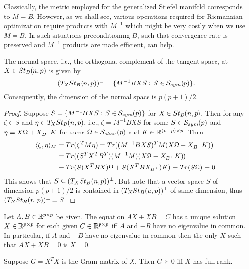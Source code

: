\documentclass[11pt,a4paper]{article}
\begin{document}
\begin{remark}
Classically, the metric employed for the generalized Stiefel manifold corresponds to $M = B$. However, as we shall see, various operations required for Riemannian optimization require products with $M^{-1}$ which might be very costly when we use $M = B$. In such situations preconditioning $B$, such that convergence rate is preserved and $M^{-1}$ products are made efficient, can help.
\end{remark}

\begin{proposition}
The normal space, i.e., the orthogonal complement of the tangent space, at $X\in St_B(n,p)$ is given by
\begin{equation}
(T_XSt_B(n,p))^\perp = \{M^{-1}BXS:\, S\in\mathcal{S}_{sym}(p) \}.
\end{equation}
Consequently, the dimension of the normal space is $p(p+1)/2$.
\end{proposition}

\begin{proof}
Suppose $S = \{M^{-1}BXS:\, S\in\mathcal{S}_{sym}(p) \}$ for $X\in St_B(n,p)$. Then for any $\zeta\in S$ and $\eta\in T_XSt_B(n,p)$, i.e., $\zeta = M^{-1}BXS$ for some $S\in \mathcal{S}_{sym}(p)$ and $\eta = X\Omega+X_{B^\perp} K$ for some $\Omega\in \mathcal{S}_{skew}(p)$ and $K\in \mathbb{R}^{(n-p)\times p}$. Then
\begin{align*}
\langle \zeta, \eta \rangle_M &= Tr(\zeta^TM\eta) = Tr((M^{-1}BXS)^TM(X\Omega+X_{B^\perp} K)) \\
&= Tr((S^TX^TB^T)(M^{-1}M)(X\Omega+X_{B^\perp} K)) \\
&= Tr(S(X^TBX)\Omega+S(X^TBX_{B^\perp}) K) = Tr(S\Omega) = 0.
\end{align*}
This shows that $S\subseteq (T_XSt_B(n,p))^\perp$. But note that a vector space $S$ of dimension $p(p+1)/2$ is contained in $(T_XSt_B(n,p))^\perp$ of same dimension, thus $(T_XSt_B(n,p))^\perp = S$.
\end{proof}

\begin{lemma}\label{lemma:sylvester_equation}
Let $A,B\in\mathbb{R}^{p\times p}$ be given. The equation $AX+XB = C$ has a unique solution $X\in\mathbb{R}^{p\times p}$ for each given $C\in\mathbb{R}^{p\times p}$ iff $A$ and $-B$ have no eigenvalue in common. In particular, if $A$ and $-B$ have no eigenvalue in common then the only $X$ such that $AX + X B = 0$ is $X = 0$.
\end{lemma}

\begin{lemma}\label{lemma:gram_matrix_spd}
Suppose $G =X^TX$ is the Gram matrix of $X$. Then $G\succ 0$ iff $X$ has full rank.
\end{lemma}
\end{document}
